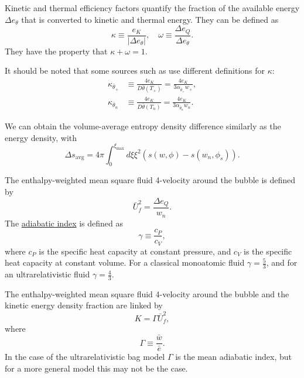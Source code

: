 Kinetic and thermal efficiency factors quantify the fraction of the available energy $\Delta e_\theta$ that is converted to kinetic and thermal energy.
They can be defined as
\begin{equation}
\kappa \equiv \frac{e_K}{| \Delta e_\theta |}, \quad
\omega \equiv \frac{\Delta e_Q}{\Delta e_\theta}.
\label{eq:kappa_omega}
\end{equation}
They have the property that $\kappa + \omega = 1$.

It should be noted that some sources such as \cites[eq. 36]{giese_2020}[eq. 12, 14]{giese_2021}
use different definitions for $\kappa$:
\begin{align}
\kappa_{\bar{\theta}_+} &\equiv \frac{4 e_K}{D \bar{\theta}(T_+)} = \frac{4 e_K}{3 \alpha_{\bar{\theta}_+} w_+},
\label{eq:kappa_thetabar_plus} \\
\kappa_{\bar{\theta}_n} &\equiv \frac{4 e_K}{D \bar{\theta}(T_n)} = \frac{4 e_K}{3 \alpha_{\bar{\theta}_n} w_n}.
\label{eq:kappa_thetabar_n}
\end{align}

We can obtain the volume-average entropy density difference similarly as the energy density, with
\begin{equation}
\Delta s_\text{avg} = 4\pi \int_0^{\xi_\text{max}} d\xi \xi^2 \left( s(w,\phi) - s(w_n, \phi_s) \right).
\end{equation}

\iffalse
Relative volume-averaged entropy density
\begin{equation}
TODO = \frac{s_\text{avg}}{s_n}
\end{equation}
\fi

The enthalpy-weighted mean square fluid 4-velocity around the bubble is defined by
\begin{equation}
\bar{U}_f^2 = \frac{\Delta e_Q}{w_n}.
\label{eq:ubarf2}
\end{equation}
The \href{https://en.wikipedia.org/wiki/Heat_capacity_ratio}{adiabatic index} is defined as
\begin{equation}
\gamma \equiv \frac{c_P}{c_V},
\end{equation}
where $c_P$ is the specific heat capacity at constant pressure,
and $c_V$ is the specific heat capacity at constant volume.
For a classical monoatomic fluid $\gamma = \frac{5}{3}$,
and for an ultrarelativistic fluid $\gamma = \frac{4}{3}$.

The enthalpy-weighted mean square fluid 4-velocity around the bubble and the kinetic energy density fraction are linked by
\begin{equation}
K = \Gamma \bar{U}_f^2,
\end{equation}
where
\begin{equation}
\Gamma \equiv \frac{\bar{w}}{\bar{e}}.
\label{eq:mean_adiabatic_index}
\end{equation}
In the case of the ultrarelativistic bag model $\Gamma$ is the mean adiabatic index,
but for a more general model this may not be the case.


